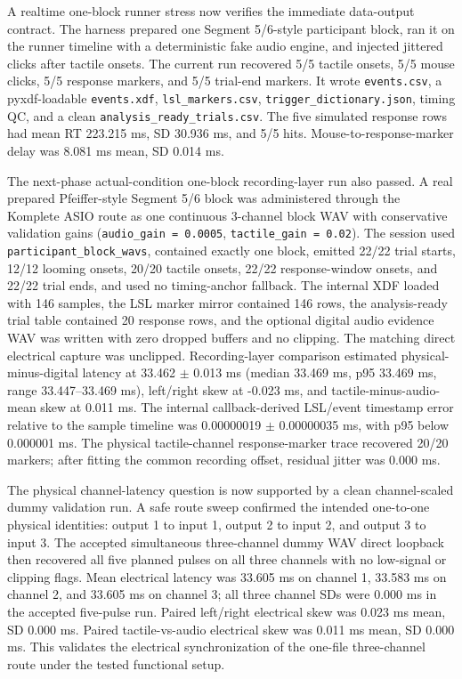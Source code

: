\documentclass[11pt]{article}
\begin{document}
A realtime one-block runner stress now verifies the immediate data-output
contract. The harness prepared one Segment 5/6-style participant block, ran it
on the runner timeline with a deterministic fake audio engine, and injected
jittered clicks after tactile onsets. The current run recovered 5/5 tactile
onsets, 5/5 mouse clicks, 5/5 response markers, and 5/5 trial-end markers. It
wrote \texttt{events.csv}, a pyxdf-loadable \texttt{events.xdf},
\texttt{lsl\_markers.csv}, \texttt{trigger\_dictionary.json}, timing QC, and a
clean \texttt{analysis\_ready\_trials.csv}. The five simulated response rows
had mean RT 223.215 ms, SD 30.936 ms, and 5/5 hits. Mouse-to-response-marker
delay was 8.081 ms mean, SD 0.014 ms.

The next-phase actual-condition one-block recording-layer run also passed. A
real prepared Pfeiffer-style Segment 5/6 block was administered through the
Komplete ASIO route as one continuous 3-channel block WAV with conservative
validation gains (\texttt{audio\_gain = 0.0005},
\texttt{tactile\_gain = 0.02}). The session used
\texttt{participant\_block\_wavs}, contained exactly one block, emitted 22/22
trial starts, 12/12 looming onsets, 20/20 tactile onsets, 22/22 response-window
onsets, and 22/22 trial ends, and used no timing-anchor fallback. The internal
XDF loaded with 146 samples, the LSL marker mirror contained 146 rows, the
analysis-ready trial table contained 20 response rows, and the optional digital
audio evidence WAV was written with zero dropped buffers and no clipping. The
matching direct electrical capture was unclipped. Recording-layer comparison
estimated physical-minus-digital latency at 33.462 $\pm$ 0.013 ms
(median 33.469 ms, p95 33.469 ms, range 33.447--33.469 ms), left/right skew at
-0.023 ms, and tactile-minus-audio-mean skew at 0.011 ms. The internal
callback-derived LSL/event timestamp error relative to the sample timeline was
0.00000019 $\pm$ 0.00000035 ms, with p95 below 0.000001 ms. The physical
tactile-channel response-marker trace recovered 20/20 markers; after fitting
the common recording offset, residual jitter was 0.000 ms.

The physical channel-latency question is now supported by a clean
channel-scaled dummy validation run. A safe route sweep confirmed the intended
one-to-one physical identities: output 1 to input 1, output 2 to input 2, and
output 3 to input 3. The accepted simultaneous three-channel dummy WAV direct
loopback then recovered all five planned pulses on all three channels with no
low-signal or clipping flags. Mean electrical latency was 33.605 ms on channel
1, 33.583 ms on channel 2, and 33.605 ms on channel 3; all three channel SDs
were 0.000 ms in the accepted five-pulse run. Paired left/right electrical skew
was 0.023 ms mean, SD 0.000 ms. Paired tactile-vs-audio electrical skew was
0.011 ms mean, SD 0.000 ms. This validates the electrical synchronization of
the one-file three-channel route under the tested functional setup.
\end{document}

